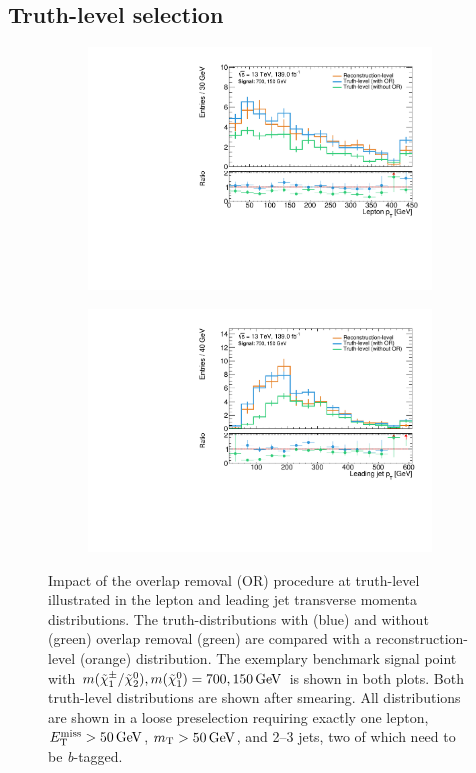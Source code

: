 \subsection{Truth-level selection}\label{sec:truth_selection}

 \begin{figure}
	\centering
	\begin{subfigure}[b]{0.48\linewidth}
		\centering\includegraphics[width=\textwidth]{20210324_noLabel_noOR/700_150/lep1Pt_C1N2_Wh_hbb_700p0_150p0_smeared.pdf}
	\end{subfigure}\hfill
	\begin{subfigure}[b]{0.48\linewidth}
		\centering\includegraphics[width=\textwidth]{20210324_noLabel_noOR/700_150/jet1Pt_C1N2_Wh_hbb_700p0_150p0_smeared.pdf}
	\end{subfigure}\hfill
	\caption{Impact of the overlap removal (OR) procedure at truth-level illustrated in the lepton and leading jet transverse momenta distributions. The truth-distributions with (blue) and without (green) overlap removal (green) are compared with a reconstruction-level (orange) distribution. The exemplary benchmark signal point with $m(\charg/\neutr), m(\lsp) = 700, \SI{150}{\GeV}$ is shown in both plots. Both truth-level distributions are shown after smearing. All distributions are shown in a loose preselection requiring exactly one lepton, $\met>\SI{50}{\GeV}$, $\mt > \SI{50}{\GeV}$, and 2--3 jets, two of which need to be \textit{b}-tagged.}
	\label{fig:overlap_removal_truth}
\end{figure}


